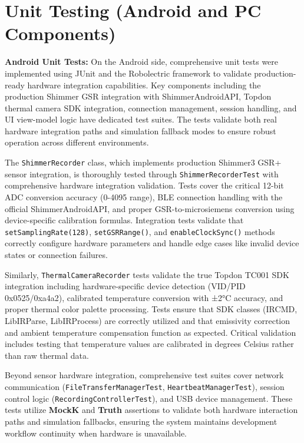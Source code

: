 \section{Unit Testing (Android and PC Components)}
\label{sec:unit-testing}
\textbf{Android Unit Tests:} On the Android side, comprehensive unit tests were implemented using JUnit and the Robolectric framework to validate production-ready hardware integration capabilities. Key components including the production Shimmer GSR integration with ShimmerAndroidAPI, Topdon thermal camera SDK integration, connection management, session handling, and UI view-model logic have dedicated test suites. The tests validate both real hardware integration paths and simulation fallback modes to ensure robust operation across different environments.

The \texttt{ShimmerRecorder} class, which implements production Shimmer3 GSR+ sensor integration, is thoroughly tested through \texttt{ShimmerRecorderTest} with comprehensive hardware integration validation. Tests cover the critical 12-bit ADC conversion accuracy (0-4095 range), BLE connection handling with the official ShimmerAndroidAPI, and proper GSR-to-microsiemens conversion using device-specific calibration formulas. Integration tests validate that \texttt{setSamplingRate(128)}, \texttt{setGSRRange()}, and \texttt{enableClockSync()} methods correctly configure hardware parameters and handle edge cases like invalid device states or connection failures.

Similarly, \texttt{ThermalCameraRecorder} tests validate the true Topdon TC001 SDK integration including hardware-specific device detection (VID/PID 0x0525/0xa4a2), calibrated temperature conversion with ±2°C accuracy, and proper thermal color palette processing. Tests ensure that SDK classes (IRCMD, LibIRParse, LibIRProcess) are correctly utilized and that emissivity correction and ambient temperature compensation function as expected. Critical validation includes testing that temperature values are calibrated in degrees Celsius rather than raw thermal data.

Beyond sensor hardware integration, comprehensive test suites cover network communication (\texttt{FileTransferManagerTest}, \texttt{HeartbeatManagerTest}), session control logic (\texttt{RecordingControllerTest}), and USB device management. These tests utilize \textbf{MockK} and \textbf{Truth} assertions to validate both hardware interaction paths and simulation fallbacks, ensuring the system maintains development workflow continuity when hardware is unavailable.

